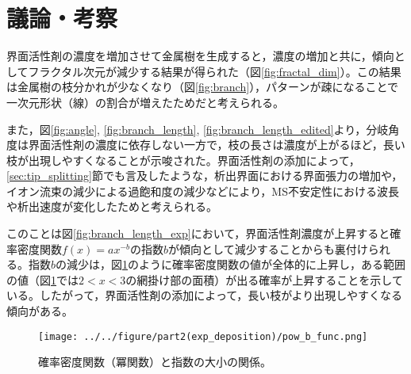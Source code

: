 \documentclass[autodetect-engine,dvi=dvipdfmx,a4paper,ja=standard,oneside,openany,11pt]{bxjsbook}
\begin{document}
\section{議論・考察}
界面活性剤の濃度を増加させて金属樹を生成すると，濃度の増加と共に，傾向としてフラクタル次元が減少する結果が得られた（図\ref{fig:fractal_dim}）。この結果は金属樹の枝分かれが少なくなり（図\ref{fig:branch}），パターンが疎になることで一次元形状（線）の割合が増えたためだと考えられる。

また，図\ref{fig:angle}, \ref{fig:branch_length}, \ref{fig:branch_length_edited}より，分岐角度は界面活性剤の濃度に依存しない一方で，枝の長さは濃度が上がるほど，長い枝が出現しやすくなることが示唆された。界面活性剤の添加によって，\ref{sec:tip_splitting}節でも言及したような，析出界面における界面張力の増加や，イオン流束の減少による過飽和度の減少などにより，MS不安定性における波長や析出速度が変化したためと考えられる。

このことは図\ref{fig:branch_length_exp}において，界面活性剤濃度が上昇すると確率密度関数$f(x)=ax^{-b}$の指数$b$が傾向として減少することからも裏付けられる。指数$b$の減少は，図\ref{fig:pow_b_func}のように確率密度関数の値が全体的に上昇し，ある範囲の値（図\ref{fig:pow_b_func}では$2<x<3$の網掛け部の面積）が出る確率が上昇することを示している。したがって，界面活性剤の添加によって，長い枝がより出現しやすくなる傾向がある。

\begin{figure}[htbp]
  \centering
  \texttt{[image: ../../figure/part2(exp\_deposition)/pow\_b\_func.png]}
  \caption{確率密度関数（冪関数）と指数の大小の関係。}
  \label{fig:pow_b_func}
\end{figure}

\ifdraft{
  
  
}{}
\end{document}
